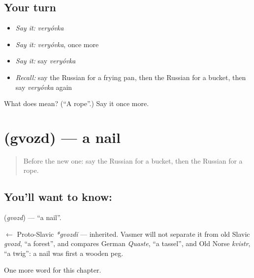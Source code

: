 \subsection*{Your turn}
\begin{itemize}
\raggedright
  \item \emph{Say it:} \emph{veryóvka}
  \item \emph{Say it:} \emph{veryóvka}, once more
  \item \emph{Say it:} say \emph{veryóvka}
  \item \emph{Recall:} say the Russian for a frying pan, then the Russian for a bucket, then say \emph{veryóvka} again
\end{itemize}

\begin{tcolorbox}[breakable,colback=teal!4,colframe=teal!35!black,title={Before you move on}]
What does  mean? (\textquotedblleft{}A rope\textquotedblright{}.) Say it once more.
\end{tcolorbox}
\section[\texorpdfstring{\ru{гвоздь} (gvozd)}{гвоздь (gvozd)}]{ (gvozd) — a nail}

\label{lesson:RU-C98-nail}



\begin{quote}
Before the new one: say the Russian for a bucket, then the Russian for a rope.
\end{quote}

\subsection*{You'll want to know: }
\textbf{} (\emph{gvozd}) — \textquotedblleft{}a nail\textquotedblright{}.

\begin{cousinweb}
\textbf{} $\leftarrow$ Proto-Slavic \emph{*gvozdĭ} — inherited. Vasmer will not separate it from old Slavic \emph{gvozd}, \textquotedblleft{}a forest\textquotedblright{}, and compares German \emph{Quaste}, \textquotedblleft{}a tassel\textquotedblright{}, and Old Norse \emph{kvistr}, \textquotedblleft{}a twig\textquotedblright{}: a nail was first a wooden peg.
\end{cousinweb}

\begin{grammarlens}[title={What you've built}]
One more word for this chapter.
\end{grammarlens}

